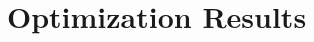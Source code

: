 \documentclass[../mthe-493-final-project.tex]{subfiles}
\begin{document}
    \chapter{Optimization Results}
    \label{ch:optimization-results}

    \section{}
    \label{sec:}
\end{document}
